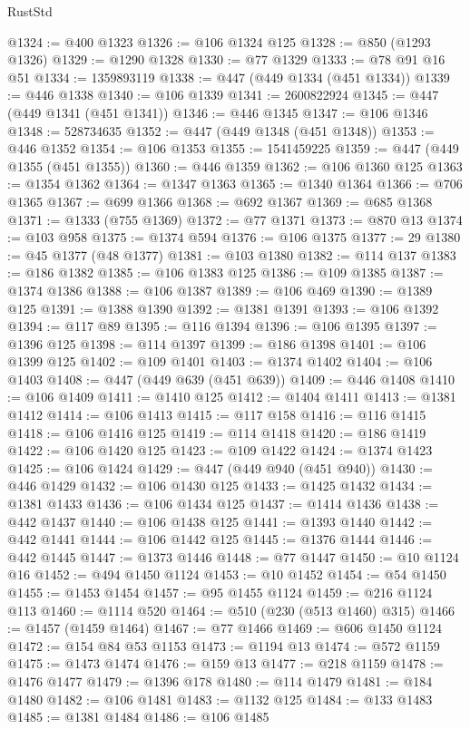 \begin{lexlean}{RustStd}
\begin{coremodule}
@1324 := @400 @1323
@1326 := @106 @1324 @125
@1328 := @850 (@1293 @1326)
@1329 := @1290 @1328
@1330 := @77 @1329
@1333 := @78 @91 @16 @51
@1334 := 1359893119
@1338 := @447 (@449 @1334 (@451 @1334))
@1339 := @446 @1338
@1340 := @106 @1339
@1341 := 2600822924
@1345 := @447 (@449 @1341 (@451 @1341))
@1346 := @446 @1345
@1347 := @106 @1346
@1348 := 528734635
@1352 := @447 (@449 @1348 (@451 @1348))
@1353 := @446 @1352
@1354 := @106 @1353
@1355 := 1541459225
@1359 := @447 (@449 @1355 (@451 @1355))
@1360 := @446 @1359
@1362 := @106 @1360 @125
@1363 := @1354 @1362
@1364 := @1347 @1363
@1365 := @1340 @1364
@1366 := @706 @1365
@1367 := @699 @1366
@1368 := @692 @1367
@1369 := @685 @1368
@1371 := @1333 (@755 @1369)
@1372 := @77 @1371
@1373 := @870 @13
@1374 := @103 @958
@1375 := @1374 @594
@1376 := @106 @1375
@1377 := 29
@1380 := @45 @1377 (@48 @1377)
@1381 := @103 @1380
@1382 := @114 @137
@1383 := @186 @1382
@1385 := @106 @1383 @125
@1386 := @109 @1385
@1387 := @1374 @1386
@1388 := @106 @1387
@1389 := @106 @469
@1390 := @1389 @125
@1391 := @1388 @1390
@1392 := @1381 @1391
@1393 := @106 @1392
@1394 := @117 @89
@1395 := @116 @1394
@1396 := @106 @1395
@1397 := @1396 @125
@1398 := @114 @1397
@1399 := @186 @1398
@1401 := @106 @1399 @125
@1402 := @109 @1401
@1403 := @1374 @1402
@1404 := @106 @1403
@1408 := @447 (@449 @639 (@451 @639))
@1409 := @446 @1408
@1410 := @106 @1409
@1411 := @1410 @125
@1412 := @1404 @1411
@1413 := @1381 @1412
@1414 := @106 @1413
@1415 := @117 @158
@1416 := @116 @1415
@1418 := @106 @1416 @125
@1419 := @114 @1418
@1420 := @186 @1419
@1422 := @106 @1420 @125
@1423 := @109 @1422
@1424 := @1374 @1423
@1425 := @106 @1424
@1429 := @447 (@449 @940 (@451 @940))
@1430 := @446 @1429
@1432 := @106 @1430 @125
@1433 := @1425 @1432
@1434 := @1381 @1433
@1436 := @106 @1434 @125
@1437 := @1414 @1436
@1438 := @442 @1437
@1440 := @106 @1438 @125
@1441 := @1393 @1440
@1442 := @442 @1441
@1444 := @106 @1442 @125
@1445 := @1376 @1444
@1446 := @442 @1445
@1447 := @1373 @1446
@1448 := @77 @1447
@1450 := @10 @1124 @16
@1452 := @494 @1450 @1124
@1453 := @10 @1452
@1454 := @54 @1450
@1455 := @1453 @1454
@1457 := @95 @1455 @1124
@1459 := @216 @1124 @113
@1460 := @1114 @520
@1464 := @510 (@230 (@513 @1460) @315)
@1466 := @1457 (@1459 @1464)
@1467 := @77 @1466
@1469 := @606 @1450 @1124
@1472 := @154 @84 @53 @1153
@1473 := @1194 @13
@1474 := @572 @1159
@1475 := @1473 @1474
@1476 := @159 @13
@1477 := @218 @1159
@1478 := @1476 @1477
@1479 := @1396 @178
@1480 := @114 @1479
@1481 := @184 @1480
@1482 := @106 @1481
@1483 := @1132 @125
@1484 := @133 @1483
@1485 := @1381 @1484
@1486 := @106 @1485

\end{coremodule}
\end{lexlean}
